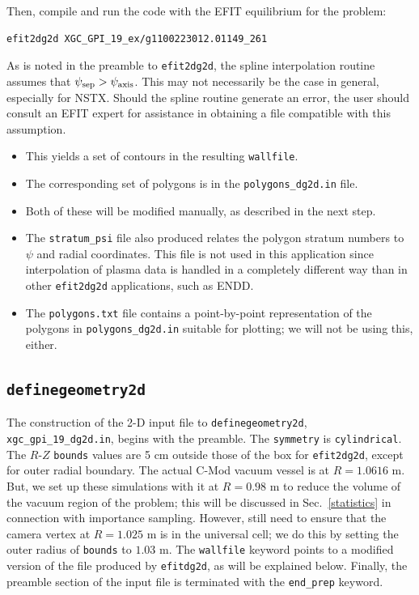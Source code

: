 \documentclass[12pt]{report}
\begin{document}
Then, compile and run the code with the EFIT equilibrium for the
problem:

\begin{verbatim}
efit2dg2d XGC_GPI_19_ex/g1100223012.01149_261 
\end{verbatim}

As is noted in the preamble to {\tt efit2dg2d}, the spline
interpolation routine assumes that $\psi_{\rm sep} > \psi_{\rm axis}$.
This may not necessarily be the case in general, especially
for NSTX.  Should the spline routine generate an error, the
user should consult an EFIT expert for assistance in obtaining
a file compatible with this assumption.

\begin{itemize}
\item This yields a set of contours in the resulting
  {\tt wallfile}.
\item The corresponding set of polygons is in the
  {\tt polygons\_dg2d.in} file.
\item Both of these will be modified manually, as described in the 
    next step.
\item The {\tt stratum\_psi} file also produced relates the polygon
  stratum numbers to $\psi$ and radial coordinates.  This file
  is not used in this application since interpolation
      of plasma data is handled in a completely different way than
      in other {\tt efit2dg2d} applications, such as ENDD.
    \item The {\tt polygons.txt} file contains a
      point-by-point representation
      of the polygons in {\tt polygons\_dg2d.in} suitable for plotting;
      we will not be using this, either.
  \end{itemize}

\subsection{\tt definegeometry2d}
\label{definegeometry2d}

The construction of the 2-D input file to {\tt definegeometry2d},
{\tt xgc\_gpi\_19\_dg2d.in},
begins with the preamble.  The {\tt symmetry} is 
{\tt cylindrical}.
The $R$-$Z$ {\tt bounds} values are 5 cm outside those of the
box for {\tt efit2dg2d}, except for outer radial boundary.
The actual C-Mod vacuum
vessel is at $R = 1.0616$ m.  But, we set up these simulations
with it at $R = 0.98$ m to reduce the volume of the vacuum
region of the problem; this will be discussed in Sec.~\ref{statistics}
in connection with importance sampling.
However, still need to ensure that the camera vertex
at $R = 1.025$ m is in the universal cell; we do
this by 
setting the
outer radius of {\tt bounds} to $1.03$ m.
The {\tt wallfile} keyword points to a modified version of
the file produced by {\tt efitdg2d}, as will be explained
below.
Finally, the preamble section of the input file is terminated with
the {\tt end\_prep} keyword.
\end{document}
